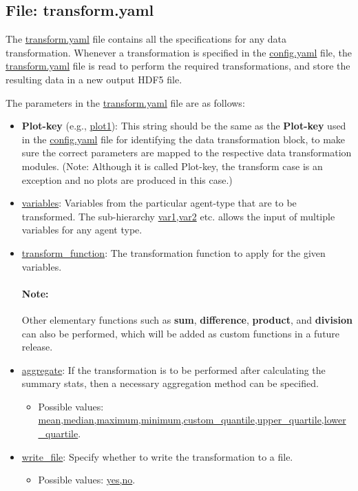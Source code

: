 \documentclass[10pt,a4paper]{article}
\begin{document}
\subsection{File: transform.yaml}

The \url{transform.yaml} file contains all the specifications for any data transformation. Whenever a transformation is specified in the \url{config.yaml} file, the \url{transform.yaml} file is read to perform the required transformations, and store the resulting data in a new output HDF5 file.

\bigskip
The parameters in the \url{transform.yaml} file are as follows:

\begin{itemize}
\item \textbf{Plot-key} (e.g., \url{plot1}): This string should be the same as the \textbf{Plot-key} used in the \url{config.yaml} file for identifying the data transformation block, to make sure the correct parameters are mapped to the respective data transformation modules.
(Note: Although it is called Plot-key, the transform case is an exception and no plots are produced in this case.)

\item \url{variables}: Variables from the particular agent-type that are to be transformed. The sub-hierarchy \url{var1,var2} etc. allows
the input of multiple variables for any agent type. 

\item \url{transform_function}: The transformation function to apply for the given variables.

\paragraph{Note:} Other elementary functions such as \textbf{sum}, \textbf{difference}, \textbf{product}, and \textbf{division} can also be performed, which will be added as custom functions in a future release.

\item \url{aggregate}: If the transformation is to be performed after calculating the summary stats, then a necessary aggregation method can be specified.
\begin{itemize}
\item Possible values: \url{mean,median,maximum,minimum,custom_quantile,upper_quartile,lower_quartile}.
\end{itemize}

\item \url{write_file}: Specify whether to write the transformation to a file.
\begin{itemize}
\item Possible values: \url{yes,no}.
\end{itemize}


\end{itemize}
\end{document}
